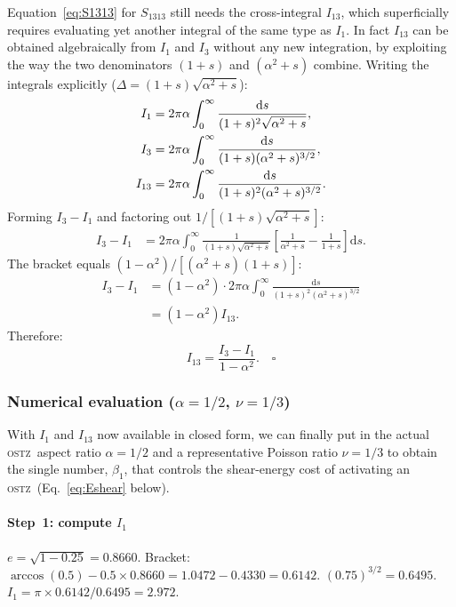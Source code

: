 \documentclass[3p]{elsarticle}
\newcommand{\OSTZ}{\textsc{ostz}}
\begin{document}
Equation~\eqref{eq:S1313} for $S_{1313}$ still needs the
cross-integral $I_{13}$, which superficially requires evaluating yet
another integral of the same type as $I_1$. In fact $I_{13}$ can be
obtained algebraically from $I_1$ and $I_3$ without any new
integration, by exploiting the way the two denominators
$(1+s)$ and $(\alpha^2+s)$ combine. Writing the integrals explicitly
($\Delta=(1+s)\sqrt{\alpha^2+s}$):
\begin{align}
  I_1&=2\pi\alpha\int_0^\infty\frac{\mathrm ds}
    {(1+s)^2\sqrt{\alpha^2+s}},\notag\\
  I_3&=2\pi\alpha\int_0^\infty\frac{\mathrm ds}
    {(1+s)(\alpha^2+s)^{3/2}},\notag\\
  I_{13}&=2\pi\alpha\int_0^\infty\frac{\mathrm ds}
    {(1+s)^2(\alpha^2+s)^{3/2}}.\notag
\end{align}
Forming $I_3-I_1$ and factoring out $1/[(1+s)\sqrt{\alpha^2+s}]$:
\begin{align*}
  I_3-I_1&=2\pi\alpha\int_0^\infty\frac{1}{(1+s)\sqrt{\alpha^2+s}}
  \!\left[\frac{1}{\alpha^2+s}-\frac{1}{1+s}\right]\mathrm ds.
\end{align*}
The bracket equals $(1-\alpha^2)/[(\alpha^2{+}s)(1{+}s)]$:
\begin{align*}
  I_3-I_1&=(1-\alpha^2)\cdot2\pi\alpha\int_0^\infty
  \frac{\mathrm ds}{(1+s)^2(\alpha^2+s)^{3/2}}\\
  &=(1-\alpha^2)I_{13}.
\end{align*}
Therefore:
\begin{equation}
  \boxed{I_{13}=\frac{I_3-I_1}{1-\alpha^2}.}\quad\square
  \label{eq:I13result}
\end{equation}

\subsubsection{Numerical evaluation ($\alpha=1/2$, $\nu=1/3$)}
\label{sec:numeval}

With $I_1$ and $I_{13}$ now available in closed form, we can finally
put in the actual \OSTZ\ aspect ratio $\alpha=1/2$ and a
representative Poisson ratio $\nu=1/3$ to obtain the single number,
$\beta_1$, that controls the shear-energy cost of activating an
\OSTZ\ (Eq.~\eqref{eq:Eshear} below).

\paragraph{Step~1: compute $I_1$}
$e=\sqrt{1-0.25}=0.8660$.
Bracket: $\arccos(0.5)-0.5\times0.8660=1.0472-0.4330=0.6142$.
$(0.75)^{3/2}=0.6495$.
$I_1=\pi\times0.6142/0.6495=\mathbf{2.972}$.
\end{document}
